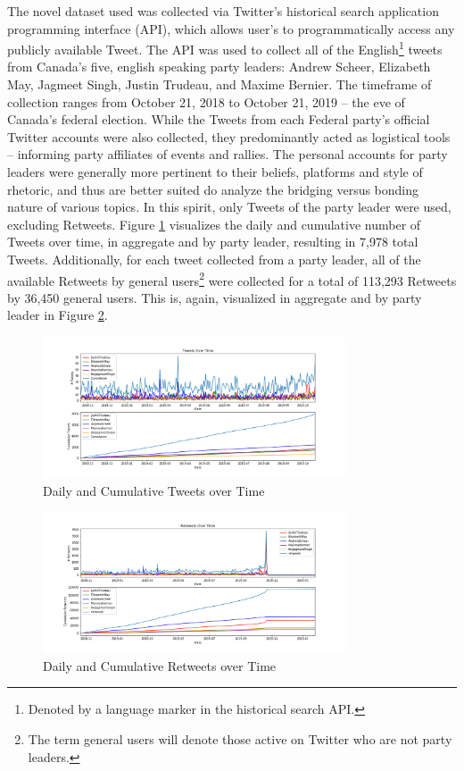\documentclass{nws}
\begin{document}
The novel dataset used was collected via Twitter's historical search application
programming interface (API), which allows user's to programmatically access any
publicly available Tweet. The API was used to collect all of the
English\footnote{Denoted by a language marker in the historical search API.}
tweets from Canada's five, english speaking party leaders: Andrew Scheer,
Elizabeth May, Jagmeet Singh, Justin Trudeau, and Maxime Bernier. The timeframe
of collection ranges from October 21, 2018 to October 21, 2019 -- the eve of
Canada’s federal election. While the Tweets from each Federal party’s official
Twitter accounts were also collected, they predominantly acted as logistical
tools – informing party affiliates of events and rallies. The personal accounts
for party leaders were generally more pertinent to their beliefs, platforms and
style of rhetoric, and thus are better suited do analyze the bridging versus
bonding nature of various topics. In this spirit, only Tweets of the party
leader were used, excluding Retweets. Figure \ref{fig:tweets_over_time}
visualizes the daily and cumulative number of Tweets over time, in aggregate and
by party leader, resulting in 7,978 total Tweets. Additionally, for each tweet collected from a party leader, all of the available
Retweets by general users\footnote{The term general users will denote those
active on Twitter who are not party leaders.} were collected for a total of
113,293 Retweets by 36,450 general users. This is, again, visualized in
aggregate and by party leader in Figure \ref{fig:retweets_over_time}.

\begin{figure}[h!]
  \centering
  \includegraphics[width=0.8\textwidth]{figures/tweets_over_time}
  \caption[Daily and Cumulative Tweets over Time]{Daily and Cumulative Tweets over Time}
  \label{fig:tweets_over_time}
\end{figure}

\begin{figure}[h!]
  \centering
  \includegraphics[width=0.8\textwidth]{figures/retweets_over_time}
  \caption[Daily and Cumulative Retweets over Time]{Daily and Cumulative Retweets over Time}
  \label{fig:retweets_over_time}
\end{figure}
\end{document}
